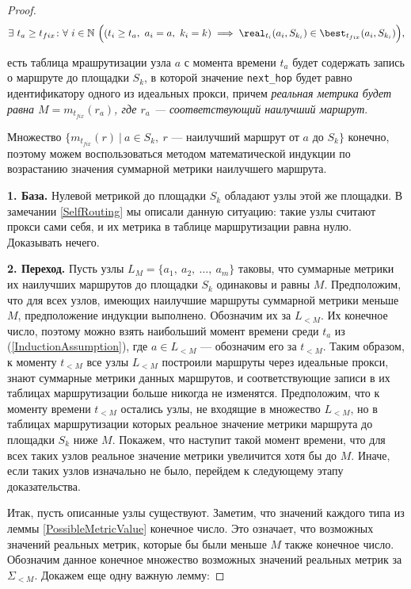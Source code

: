 \begin{proof}
    \begin{equation}
    \label{InductionAssumption}
        \exists\ t_a \geq t_{fix} \colon \forall\ i \in \mathbb{N}\ \Big( (t_i \geq t_a,\ a_i = a,\ k_i = k) \implies {\real}_{t_i}(a_i, S_{k_i}) \in {\best}_{t_{fix}}(a_i, S_{k_i}) \Big),
    \end{equation}
    
     есть таблица мрашрутизации узла $a$ с момента времени $t_a$ будет содержать запись о маршруте до площадки $S_k$, в которой значение \texttt{next\_hop} будет равно идентификатору одного из идеальных прокси, причем \textit{реальная метрика будет равна $M = m_{t_{fix}}(r_a)$, где $r_a$ --- соответствующий наилучший маршрут}.
    
    Множество $\{ m_{t_{fix}}(r)\ |\ a \in S_k,\ r \text{ --- наилучший маршрут от } a \text{ до } S_k \}$ конечно, поэтому можем воспользоваться методом математической индукции по возрастанию значения суммарной метрики наилучшего маршрута.
    
    \textbf{1. База.} Нулевой метрикой до площадки $S_k$ обладают узлы этой же площадки. В замечании \ref{SelfRouting} мы описали данную ситуацию: такие узлы считают прокси сами себя, и их метрика в таблице маршрутизации равна нулю. Доказывать нечего.
    
    \textbf{2. Переход.} Пусть узлы $L_M = \{ a_1,\ a_2,\ \ldots,\ a_m \}$ таковы, что суммарные метрики их наилучших маршрутов до площадки $S_k$ одинаковы и равны $M$. Предположим, что для всех узлов, имеющих наилучшие маршруты суммарной метрики меньше $M$, предположение индукции выполнено. Обозначим их за $L_{< M}$. Их конечное число, поэтому можно взять наибольший момент времени среди $t_a$ из (\ref{InductionAssumption}), где $a \in L_{< M}$ --- обозначим его за $t_{< M}$. Таким образом, к моменту $t_{< M}$ все узлы $L_{< M}$ построили маршруты через идеальные прокси, знают суммарные метрики данных маршрутов, и соответствующие записи в их таблицах маршрутизации больше никогда не изменятся. Предположим, что к моменту времени $t_{< M}$ остались узлы, не входящие в множество $L_{< M}$, но в таблицах маршрутизации которых реальное значение метрики маршрута до площадки $S_k$ ниже $M$. Покажем, что наступит такой момент времени, что для всех таких узлов реальное значение метрики увеличится хотя бы до $M$. Иначе, если таких узлов изначально не было, перейдем к следующему этапу доказательства.
    
    Итак, пусть описанные узлы существуют. Заметим, что значений каждого типа из леммы \ref{PossibleMetricValue} конечное число. Это означает, что возможных значений реальных метрик, которые бы были меньше $M$ также конечное число. Обозначим данное конечное множество возможных значений реальных метрик за $\Sigma_{< M}$. Докажем еще одну важную лемму:
    

\end{proof}
